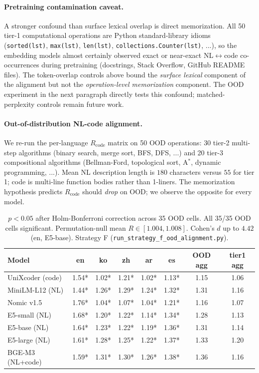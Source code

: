 \documentclass[11pt]{article}
\theoremstyle{definition}
\begin{document}
\paragraph{Pretraining contamination caveat.} A stronger confound than surface lexical overlap is direct memorization. All 50 tier-1 computational operations are Python standard-library idioms (\texttt{sorted(lst)}, \texttt{max(lst)}, \texttt{len(lst)}, \texttt{collections.Counter(lst)}, ...), so the embedding models almost certainly observed exact or near-exact NL$\leftrightarrow$code co-occurrences during pretraining (docstrings, Stack Overflow, GitHub README files). The token-overlap controls above bound the \emph{surface lexical} component of the alignment but not the \emph{operation-level memorization} component. The OOD experiment in the next paragraph directly tests this confound; matched-perplexity controls remain future work.

\paragraph{Out-of-distribution NL-code alignment.}
We re-run the per-language $R_{\text{code}}$ matrix on 50 OOD operations: 30 tier-2 multi-step algorithms (binary search, merge sort, BFS, DFS, ...) and 20 tier-3 compositional algorithms (Bellman-Ford, topological sort, A$^{\!*}$, dynamic programming, ...). Mean NL description length is $180$ characters versus $55$ for tier 1; code is multi-line function bodies rather than 1-liners. The memorization hypothesis predicts $R_{\text{code}}$ should \emph{drop} on OOD; we observe the opposite for every model.

\begin{table}[h]
\centering
\small
\begin{tabular}{lccccc|cc}
\toprule
\textbf{Model} & \textbf{en} & \textbf{ko} & \textbf{zh} & \textbf{ar} & \textbf{es} & \textbf{OOD agg} & \textbf{tier1 agg} \\
\midrule
UniXcoder (code)   & 1.54* & 1.02* & 1.21* & 1.02* & 1.13* & 1.15 & 1.06 \\
MiniLM-L12 (NL)    & 1.44* & 1.26* & 1.29* & 1.24* & 1.32* & 1.31 & 1.16 \\
Nomic v1.5         & 1.76* & 1.04* & 1.07* & 1.04* & 1.21* & 1.16 & 1.07 \\
E5-small (NL)      & 1.68* & 1.20* & 1.22* & 1.14* & 1.34* & 1.28 & 1.13 \\
E5-base (NL)       & 1.64* & 1.23* & 1.22* & 1.19* & 1.36* & 1.31 & 1.14 \\
E5-large (NL)      & 1.61* & 1.28* & 1.25* & 1.22* & 1.37* & 1.33 & 1.20 \\
BGE-M3 (NL+code)   & 1.59* & 1.31* & 1.30* & 1.26* & 1.38* & 1.36 & 1.16 \\
\bottomrule
\end{tabular}
\caption*{\small * $p < 0.05$ after Holm-Bonferroni correction across 35 OOD cells. All 35/35 OOD cells significant. Permutation-null mean $R \in [1.004, 1.008]$. Cohen's $d$ up to $4.42$ (en, E5-base). Strategy F (\texttt{run\_strategy\_f\_ood\_alignment.py}).}
\end{table}
\end{document}
